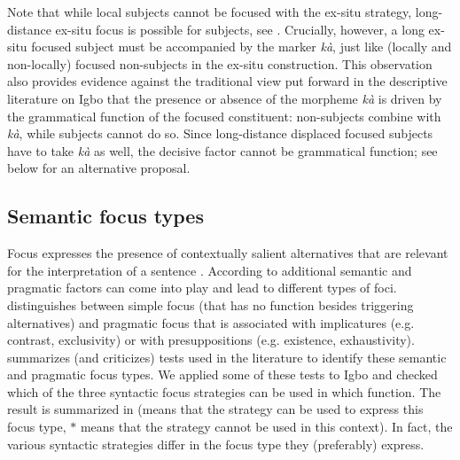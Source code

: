 \documentclass[output=paper,colorlinks,citecolor=brown]{langscibook}
\begin{document}
Note that while local subjects cannot be focused with the ex-situ strategy, long-distance ex-situ focus is possible for subjects, see . Crucially, however, a long ex-situ focused subject must be accompanied by the marker \textit{k\`a}, just like (locally and non-locally) focused non-subjects in the ex-situ construction. This observation also provides evidence against the traditional view put forward in the descriptive literature on Igbo that the presence or absence of the morpheme \textit{k\`a} is driven by the grammatical function of the focused constituent: non-subjects combine with \textit{k\`a}, while subjects cannot do so. Since long-distance displaced focused subjects have to take \textit{k\`a} as well, the decisive factor cannot be grammatical function; see below for an alternative proposal.

\subsection{Semantic focus types}\label{sec:amaechi:2.2}

Focus expresses the presence of contextually salient alternatives that are relevant for the interpretation of a sentence \citep{Rooth1985, Rooth1992}. According to \citet{ZimmermannOnea2011} additional semantic and pragmatic factors can come into play and lead to different types of foci. \citet{Bazalgette2015} distinguishes between simple focus (that has no function besides triggering alternatives) and pragmatic focus that is associated with implicatures (e.g. contrast, exclusivity) or with presuppositions (e.g. existence, exhaustivity). \citet{VanDerWal2016} summarizes (and criticizes) tests used in the literature to identify these semantic and pragmatic focus types. We applied some of these tests to Igbo and checked which of the three syntactic focus strategies can be used in which function. The result is summarized in  (\langscicheckmark means that the strategy can be used to express this focus type, $\ast$ means that the strategy cannot be used in this context). In fact, the various syntactic strategies differ in the focus type they (preferably) express.
\end{document}
